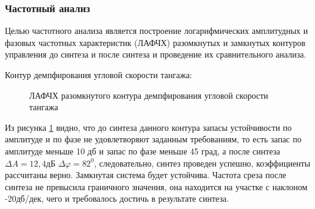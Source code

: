 \subsubsection{Частотный анализ}

Целью частотного анализа является построение логарифмических амплитудных и фазовых частотных характеристик (ЛАФЧХ) разомкнутых и замкнутых контуров управления до синтеза и после синтеза и проведение их сравнительного анализа.

\begin{center}
    Контур демпфирования угловой скорости тангажа:
\end{center}

\begin{figure}[H]
    \caption{ЛАФЧХ разомкнутого контура демпфирования угловой скорости тангажа}
    \label{fig:Угловая скорость тангажа раз qMIN}
\end{figure}

Из рисунка \ref{fig:Угловая скорость тангажа раз qMIN} видно, что до синтеза данного контура запасы устойчивости по амплитуде и по фазе не удовлетворяют заданным требованиям, то есть запас по амплитуде меньше 10 дб и запас по фазе меньше 45 град, а после синтеза $\Delta A = 12,4$дБ $\Delta \varphi = 82^0$, следовательно, синтез проведен успешно, коэффициенты рассчитаны верно. Замкнутая система будет устойчива. Частота среза после синтеза не превысила граничного значения, она находится на участке с наклоном -20дб/дек, чего и требовалось достичь в результате синтеза.  

